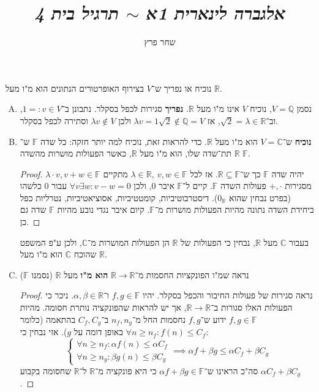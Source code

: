 \documentclass[]{article}
\author{שחר פרץ}
\title{\textit{אלגברה לינארית 1א $\sim$ תרגיל בית 4}}
\newcommand\R     {\mathbb{R}}
\newcommand\Q     {\mathbb{Q}}
\newcommand\C     {\mathbb{C}}
\newcommand\F         {\mathbb{F}}
\newcommand\co        {\colon}
\newcommand\ag        {\alpha}
\newcommand\bg        {\beta}
\renewcommand\lg      {\lambda}
\newcommand\dequad    {\!\!\!\!\!\!}
\theoremstyle{definition}
\begin{document}
	\maketitle
	\section{}
	נוכיח או נפריך ש־$V$ בצירוף האופרטורים הנתונים הוא מ"ו מעל $\R$. 
	\begin{enumerate}[(A)]
		\item נסמן $V = \Q$, נוכיח $V$ אינו מ"ו מעל $\R$. \textbf{נפריך} סגירות לכפל בסקלר. נתבונן ב־$1 =: v \in V$, וב־$\sqrt{2} = \lg \in \R$, אז $\lg v = 1 \sqrt{2} \notin \Q = V$ ולכן $\lg v \notin V$ וסתירה לכפל בסקלר. 
		\item \textbf{נוכיח} ש־$V = \C$ הוא מ"ו מעל $\R$. כדי להראות זאת, נוכיח למה יותר חזקה: כל שדה $\F$ ש־$\R$ תת־שדה שלו, הוא מ"ו מעל $\R$, כאשר הפעולות מושרות מהשדה $\F$. 
		\begin{proof}
			יהיה שדה $\F$ כך ש־$\R \subseteq \F$. אז לכל $\lg \in \R, \ v, w \in \F$ מתקיים $\lg \cdot v, v + w \in \F$ מסגירות $+ , \cdot$ פעולות השדה $\F$. קיים ל־$\F$ איבר $0$, ולכן $\forall v \exists w \co v - w = 0$ עבור $0$ כלשהו (בפרט נבחין שהוא $0_\R$). דיסטרבוטיביות, קומטטיביות, אסוציאטיביות, נטרליות כפל ביחידת השדה נתונה מהיות הפעולות מושרות מ־$\F$. קיום איבר נגדי נובע מהיות $\F$ שדה גם כן. 
		\end{proof}
		בעבור $\C$ מעל $\R$, נבחין כי הפעולות של $\R$ הן הפעולות המושרות מ־$\C$, ולכן ע"פ המשפט שהוכח $\C$ הוא מ"ו מעל $\R$. 
		\item נראה שמ"ו הפונקציות החסמות מ־$\R \to \R$ \textbf{הוא מ"ו} מעל $\R$ (נסמנו $\F$) \begin{proof}
			נראה סגירות של פעולות החיבור והכפל בסקלר. יהיו $f, g \in \F$ ו־$\ag, \bg \in \R$. ניכר כי הפעולות האלו סגורות ב־$\R \to \R$, אך יש להראות שהפונקציה נותרת חסומה. מהיות $f, g \in \F$ ידוע ש־$f, g$ נחסמות החל מ־$n_f, n_g$ ב־$C_f, C_g$ בהתאמה (כלומר $\forall n \ge n_f \co f(n) \le C_f$ באופן דומה על $g$). אזי נבחין כי: 
			\[ \begin{cases}
				\forall n \ge n_f \co \ag f(n) \le \ag C_f
				\\ \forall n \ge n_g \co \bg g(n) \le \bg C_g
			\end{cases}\dequad\!\! \implies \ag f + \bg g \le \ag C_f + \bg C_g \]
			סה"כ הראינו ש־$\ag f + \bg g \in \F$ כי היא פונקציה מ־$\R$ ל־$\R$ שחסומה בקבוע $\ag C_f + \bg C_g$. 
			

\end{proof}
\end{enumerate}
\end{document}
